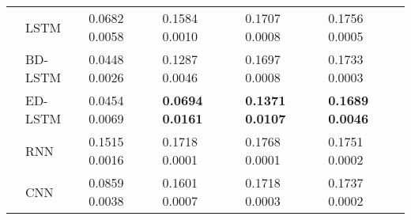 \documentclass{ieeeaccess}
\begin{document}
\begin{table*}[htbp!]
\begin{tabular}{llllll}
&LSTM   & 0.0682    0.0058     	& 0.1584    0.0010       &	 0.1707    0.0008       & 0.1756    0.0005 \\

&BD-LSTM   & 0.0448   0.0026     	&  0.1287   0.0046        &0.1697   0.0008	       &0.1733   0.0003\\

&ED-LSTM   & 0.0454   0.0069     	& \textbf{0.0694   0.0161}        &	\textbf{0.1371   0.0107}        & \textbf{0.1689   0.0046}\\

&RNN  &    0.1515 0.0016    	& 0.1718   0.0001       &	 0.1768   0.0001       &0.1751   0.0002\\

&CNN & 0.0859	 0.0038     	& 	0.1601 	0.0007       &	0.1718 	0.0003       &0.1737 	0.0002\\
\hline

\end{tabular}
\end{table*}
\end{document}
